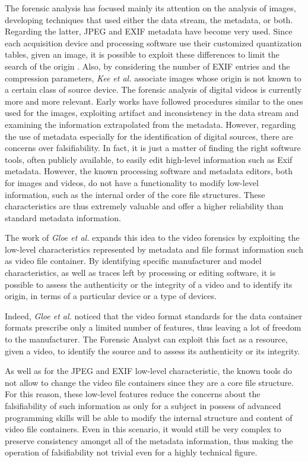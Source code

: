 The forensic analysis has focused mainly its attention on the analysis of images, developing techniques that used either the data stream, the metadata, or both. Regarding the latter, JPEG \cite{jpeg} and EXIF \cite{exif} metadata have become very used. Since each acquisition device and processing software use their customized quantization tables, given an image, it is possible to exploit these differences to limit the search of the origin \cite{farid}. Also, by considering the number of EXIF entries and the compression parameters, \emph{Kee et al.} \cite{kee2001} associate images whose origin is not known to a certain class of source device.
The forensic analysis of digital videos is currently more and more relevant. Early works have followed procedures similar to the ones used for the images, exploiting artifact and inconsistency in the data stream and examining the information extrapolated from the metadata.
However, regarding the use of metadata especially for the identification of digital sources, there are concerns over falsifiability. In fact, it is just a matter of finding the right software tools, often publicly available, to easily edit high-level information such as Exif metadata.
However, the known processing software and metadata editors, both for images and videos, do not have a functionality to modify low-level information, such as the internal order of the core file structures. These characteristics are thus extremely valuable and offer a higher reliability than standard metadata information.

The work of \emph{Gloe et al.} \cite{Gloe2014S68} expands this idea to the video forensics by exploiting the low-level characteristics represented by metadata and file format information such as video file container. By identifying specific manufacturer and model characteristics, as well as traces left by processing or editing software, it is possible to assess the authenticity or the integrity of a video and to identify its origin, in terms of a particular device or a type of devices.

Indeed, \emph{Gloe et al.} noticed that the video format standards for the data container formats prescribe only a limited number of features, thus leaving a lot of freedom to the manufacturer. The Forensic Analyst can exploit this fact as a resource, given a video, to identify the source and to assess its authenticity or its integrity. 

As well as for the JPEG and EXIF low-level characteristic, the known tools do not allow to change the video file containers since they are a core file structure. For this reason, these low-level features reduce the concerns about the falsifiability of such information as only for a subject in possess of advanced programming skills will be able to modify the internal structure and content of video file containers. Even in this scenario, it would still be very complex to preserve consistency amongst all of the metadata information, thus making the operation of falsifiability not trivial even for a highly technical figure.

